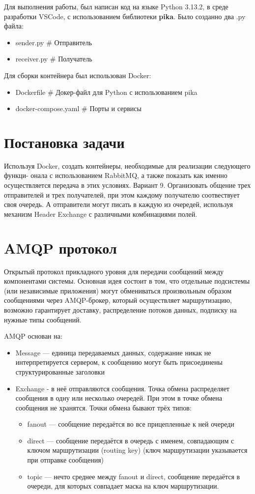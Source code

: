 \documentclass[areasetadvanced]{scrartcl}
\begin{document}
Для выполнения работы, был написан код на языке Python 3.13.2, в среде разработки VSCode, с использованием библиотеки \textbf{pika}.
Было созданно два .py файла:
\begin{itemize}
	\item sender.py \# Отправитель
	\item receiver.py \# Получатель
\end{itemize}

Для сборки контейнера был использован Docker:
\begin{itemize}
	\item Dockerfile \# Докер-файл для Python с использованием pika
	\item docker-compose.yaml \# Порты и сервисы 
\end{itemize}

\newpage
\section{Постановка задачи}
Используя Docker, создать контейнеры, необходимые для реализации следующего функци-
онала с использованием RabbitMQ, а также показать как именно осуществляется передача
в этих условиях.
Вариант 9. Организовать общение трех отправителей и трех получателей, при этом каждому
получателю соотвествует своя очередь. А отправители могут писать в каждую из очередей,
используя механизм Header Exchange с различными комбинациями полей.

\newpage
\section{AMQP протокол}
Открытый протокол прикладного уровня для передачи сообщений между компонентами системы. Основная идея состоит в том, что отдельные подсистемы (или независимые приложения) могут обмениваться произвольным образом сообщениями через AMQP-брокер, который осуществляет маршрутизацию, возможно гарантирует доставку, распределение потоков данных, подписку на нужные типы сообщений.

AMQP основан на:
\begin{itemize}
	\item Message — единица передаваемых данных, содержание никак не интерпретируется сервером, к сообщению могут быть присоединены структурированные заголовки
	\item Exchange - в неё отправляются сообщения. Точка обмена распределяет сообщения в одну или несколько очередей. При этом в точке обмена сообщения не хранятся. Точки обмена бывают трёх типов: \begin{itemize}
		\item fanout — сообщение передаётся во все прицепленные к ней очереди
		\item direct — сообщение передаётся в очередь с именем, совпадающим с ключом маршрутизации (routing key) (ключ маршрутизации указывается при отправке сообщения)
		\item topic — нечто среднее между fanout и direct, сообщение передаётся в очереди, для которых совпадает маска на ключ маршрутизации.
	\end{itemize}
\end{itemize}
\end{document}
